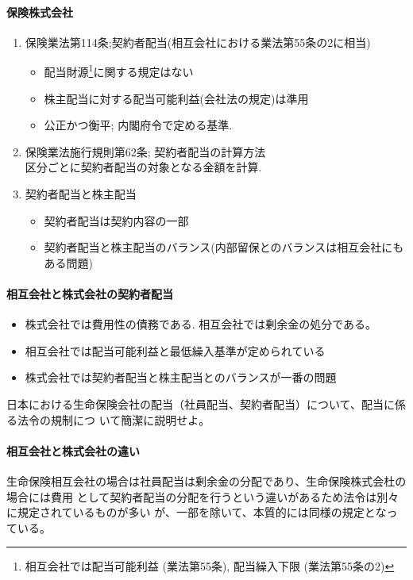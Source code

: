 \documentclass[report,gutter=10mm,fore-edge=10mm,uplatex,dvipdfmx]{jlreq}
\begin{document}
\paragraph{保険株式会社}
\begin{enumerate}
 \item 保険業法第114条;契約者配当(相互会社における業法第55条の2に相当)
\begin{itemize}
 \item 配当財源\footnote{ 相互会社では配当可能利益 (業法第55条),  配当繰入下限 (業法第55条の2)}に関する規定はない
 \item 株主配当に対する配当可能利益(会社法の規定)は準用
 \item 公正かつ衡平; 内閣府令で定める基準. 
\end{itemize}
 \item 保険業法施行規則第62条; 契約者配当の計算方法\\
       区分ごとに契約者配当の対象となる金額を計算.  
 \item 契約者配当と株主配当
\begin{itemize}
 \item 契約者配当は契約内容の一部
 \item 契約者配当と株主配当のバランス(内部留保とのバランスは相互会社にもある問題)
\end{itemize}
\end{enumerate}

\paragraph{相互会社と株式会社の契約者配当}
\begin{itemize}
 \item 株式会社では費用性の債務である. 相互会社では剰余金の処分である。
 \item 相互会社では配当可能利益と最低繰入基準が定められている
 \item 株式会社では契約者配当と株主配当とのバランスが一番の問題
\end{itemize}

日本における生命保険会社の配当（社員配当、契約者配当）について、配当に係る法令の規制につ
いて簡潔に説明せよ。

\paragraph{相互会社と株式会社の違い}
生命保険相互会社の場合は社員配当は剰余金の分配であり、生命保険株式会杜の場合には費用
として契約者配当の分配を行うという違いがあるため法令は別々に規定されているものが多い
が、一部を除いて、本質的には同様の規定となっている。
\end{document}
